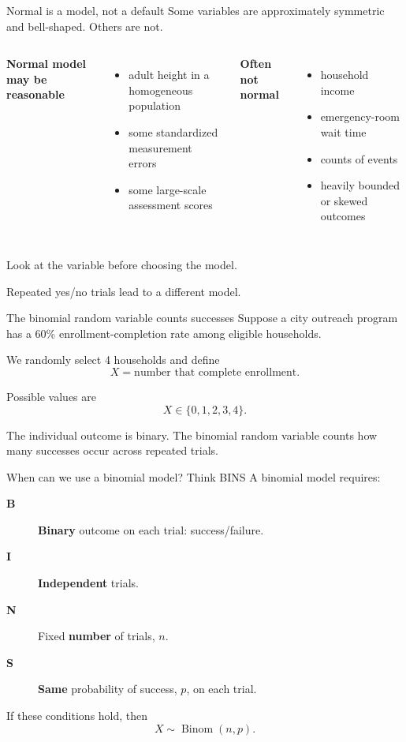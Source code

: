 \documentclass[11pt,aspectratio=169]{beamer}
\begin{document}
\begin{frame}{Normal is a model, not a default}
Some variables are approximately symmetric and bell-shaped. Others are not.

\begin{columns}[T,onlytextwidth]
\textbf{Normal model may be reasonable}
\begin{itemize}
  \item adult height in a homogeneous population
  \item some standardized measurement errors
  \item some large-scale assessment scores
\end{itemize}

\textbf{Often not normal}
\begin{itemize}
  \item household income
  \item emergency-room wait time
  \item counts of events
  \item heavily bounded or skewed outcomes
\end{itemize}
\end{columns}

\vfill
\alert{Look at the variable before choosing the model.}
\end{frame}

\begin{frame}[standout]
\Large Repeated yes/no trials lead to a different model.
\end{frame}

\begin{frame}{The binomial random variable counts successes}
Suppose a city outreach program has a 60\% enrollment-completion rate among eligible households.

We randomly select 4 households and define
\[
X=\text{number that complete enrollment}.
\]

Possible values are
\[
X\in\{0,1,2,3,4\}.
\]

\vfill
The individual outcome is binary. The \alert{binomial random variable} counts how many successes occur across repeated trials.
\end{frame}

\begin{frame}{When can we use a binomial model? Think BINS}
A binomial model requires:

\begin{description}
  \item[\textbf{B}] \textbf{Binary} outcome on each trial: success/failure.
  \item[\textbf{I}] \textbf{Independent} trials.
  \item[\textbf{N}] Fixed \textbf{number} of trials, $n$.
  \item[\textbf{S}] \textbf{Same} probability of success, $p$, on each trial.
\end{description}

\vfill
If these conditions hold, then
\[
X\sim \operatorname{Binom}(n,p).
\]
\end{frame}
\end{document}
